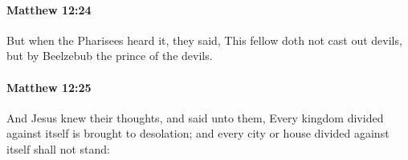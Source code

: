 		\paragraph{Matthew 12:24} %
			\label{MATTHEW-12-24}

			But when the Pharisees heard it, they said, This fellow doth not cast out devils, but by Beelzebub the prince of the devils.

			\begin{framed}
			\scriptsize
				\begin{compactdesc}
					\item[SBLG] 
				\end{compactdesc}
			\end{framed}

		\paragraph{Matthew 12:25} %
			\label{MATTHEW-12-25}

			And Jesus knew their thoughts, and said unto them, Every kingdom divided against itself is brought to desolation; and every city or house divided against itself shall not stand:

